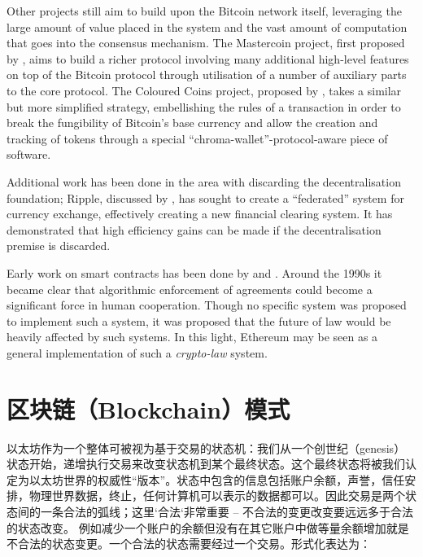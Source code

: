 \documentclass[UTF8,nofonts]{ctexart}
\begin{document}
\begin{multicols}{2}
Other projects still aim to build upon the Bitcoin network itself, leveraging the large amount of value placed in the system and the vast amount of computation that goes into the consensus mechanism. The Mastercoin project, first proposed by \cite{mastercoin2013willett}, aims to build a richer protocol involving many additional high-level features on top of the Bitcoin protocol through utilisation of a number of auxiliary parts to the core protocol. The Coloured Coins project, proposed by \cite{colouredcoins2012rosenfeld}, takes a similar but more simplified strategy, embellishing the rules of a transaction in order to break the fungibility of Bitcoin's base currency and allow the creation and tracking of tokens through a special ``chroma-wallet''-protocol-aware piece of software.

Additional work has been done in the area with discarding the decentralisation foundation; Ripple, discussed by \cite{boutellier2014pirates}, has sought to create a ``federated'' system for currency exchange, effectively creating a new financial clearing system. It has demonstrated that high efficiency gains can be made if the decentralisation premise is discarded.

Early work on smart contracts has been done by \cite{szabo1997formalizing} and \cite{miller1997future}. Around the 1990s it became clear that algorithmic enforcement of agreements could become a significant force in human cooperation. Though no specific system was proposed to implement such a system, it was proposed that the future of law would be heavily affected by such systems. In this light, Ethereum may be seen as a general implementation of such a \textit{crypto-law} system.

\section{区块链（Blockchain）模式} \label{ch:overview}

以太坊作为一个整体可被视为基于交易的状态机：我们从一个创世纪（genesis）状态开始，递增执行交易来改变状态机到某个最终状态。这个最终状态将被我们认定为以太坊世界的权威性``版本''。状态中包含的信息包括账户余额，声誉，信任安排，物理世界数据，终止，任何计算机可以表示的数据都可以。因此交易是两个状态间的一条合法的弧线；这里`合法`非常重要 -- 不合法的变更改变要远远多于合法的状态改变。 例如减少一个账户的余额但没有在其它账户中做等量余额增加就是不合法的状态变更。一个合法的状态需要经过一个交易。形式化表达为：


\end{multicols}
\end{document}
